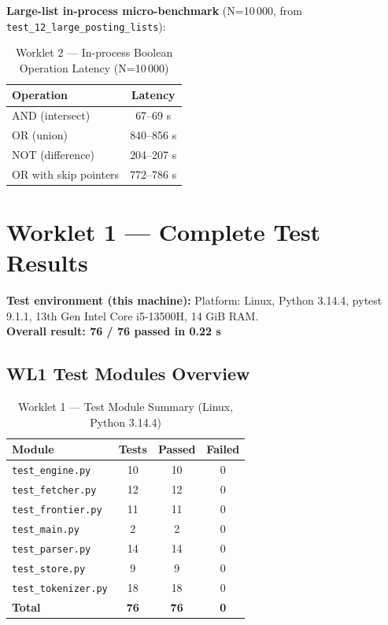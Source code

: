 \documentclass[12pt]{article}
\begin{document}
\noindent\textbf{Large-list in-process micro-benchmark} (N=10\,000, from \texttt{test\_12\_large\_posting\_lists}):
\begin{table}[H]
\centering
\caption{Worklet 2 --- In-process Boolean Operation Latency (N=10\,000)}
\begin{tabular}{|l|c|}
\hline
\textbf{Operation}      & \textbf{Latency} \\
\hline
AND (intersect)         & 67--69 \textmu{}s \\
OR (union)              & 840--856 \textmu{}s \\
NOT (difference)        & 204--207 \textmu{}s \\
OR with skip pointers   & 772--786 \textmu{}s \\
\hline
\end{tabular}
\end{table}

\section*{Worklet 1 --- Complete Test Results}

\textbf{Test environment (this machine):}
Platform: Linux, Python 3.14.4, pytest 9.1.1, 13th Gen Intel Core i5-13500H, 14 GiB RAM.\\
\textbf{Overall result: \textcolor{codegreen}{76 / 76 passed in 0.22 s}}

\subsection*{WL1 Test Modules Overview}

\begin{table}[H]
\centering
\caption{Worklet 1 --- Test Module Summary (Linux, Python 3.14.4)}
\begin{tabular}{|l|c|c|c|}
\hline
\textbf{Module}              & \textbf{Tests} & \textbf{Passed} & \textbf{Failed} \\
\hline
\texttt{test\_engine.py}     & 10             & 10              & 0 \\
\texttt{test\_fetcher.py}    & 12             & 12              & 0 \\
\texttt{test\_frontier.py}   & 11             & 11              & 0 \\
\texttt{test\_main.py}       & 2              & 2               & 0 \\
\texttt{test\_parser.py}     & 14             & 14              & 0 \\
\texttt{test\_store.py}      & 9              & 9               & 0 \\
\texttt{test\_tokenizer.py}  & 18             & 18              & 0 \\
\hline
\textbf{Total}               & \textbf{76}    & \textbf{76}     & \textbf{0} \\
\hline
\end{tabular}
\end{table}
\end{document}
